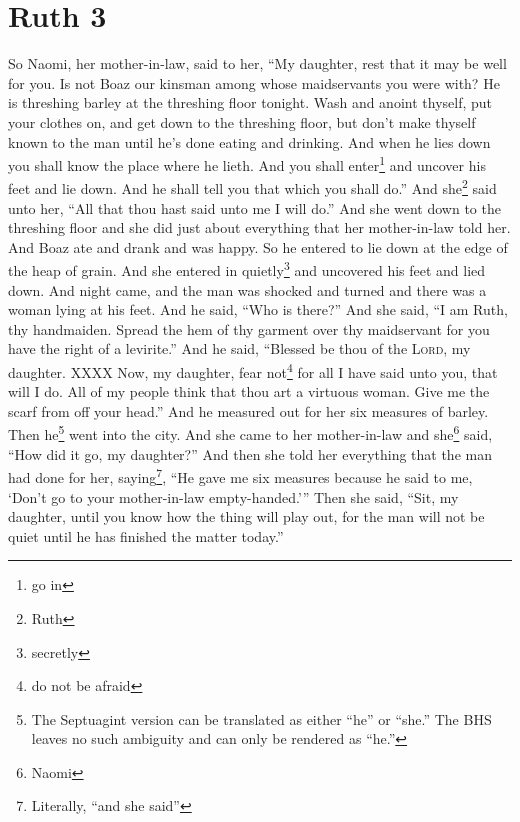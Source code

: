 \section{Ruth 3}\label{Ruth 3}
\begin{enumerate}
     So Naomi, her mother-in-law, said to her, ``My daughter, rest that it may be well for you.%
     Is not Boaz our kinsman among whose maidservants you were with? He is threshing barley at the threshing floor tonight.%
     Wash and anoint thyself, put your clothes on, and get down to the threshing floor, but don't make thyself known to the man until he's done eating and drinking.%
     And when he lies down you shall know the place where he lieth. And you shall enter\footnote{go in} and uncover his feet and lie down. And he shall tell you that which you shall do.''%
     And she\footnote{Ruth} said unto her, ``All that thou hast said unto me I will do.''%
     And she went down to the threshing floor and she did just about everything that her mother-in-law told her.%
     And Boaz ate and drank and was happy. So he entered to lie down at the edge of the heap of grain. And she entered in quietly\footnote{secretly} and uncovered his feet and lied down.%
     And night came, and the man was shocked and turned and there was a woman lying at his feet.%
     And he said, ``Who is there?'' And she said, ``I am Ruth, thy handmaiden. Spread the hem of thy garment over thy maidservant for you have the right of a levirite.''%
     And he said, ``Blessed be thou of the \textsc{Lord}, my daughter. XXXX%
     Now, my daughter, fear not\footnote{do not be afraid} for all I have said unto you, that will I do. All of my people think that thou art a virtuous woman.%
     Give me the scarf from off your head.'' And he measured out for her six measures of barley. Then he\footnote{The Septuagint version can be translated as either ``he'' or ``she.'' The BHS leaves no such ambiguity and can only be rendered as ``he.''} went into the city.%
     And she came to her mother-in-law and she\footnote{Naomi} said, ``How did it go, my daughter?'' And then she told her everything that the man had done for her,%
     saying\footnote{Literally, ``and she said''}, ``He gave me six measures because he said to me, `Don't go to your mother-in-law empty-handed.'''%
     Then she said, ``Sit, my daughter, until you know how the thing will play out, for the man will not be quiet until he has finished the matter today.''%
\end{enumerate}
